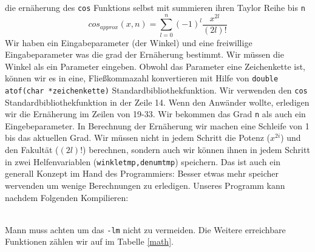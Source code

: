 die ernäherung des \texttt{cos} Funktions selbst mit summieren ihren Taylor Reihe
bis \texttt{n}
\begin{equation}
cos_{approx}\left(x,n\right)=\sum_{l=0}^{n} \left(-1\right)^{l} \dfrac{x^{2l}}{\left(2l\right)!}
\end{equation}
Wir haben ein Eingabeparameter (der Winkel) und eine freiwillige Eingabeparameter
was die grad der Ernäherung bestimmt. Wir müssen die Winkel als ein Parameter eingeben.
Obwohl das Parameter eine Zeichenkette ist, können wir es in eine, Fließkommazahl konvertieren
mit Hilfe von \texttt{double atof(char *zeichenkette)} Standardbibliothekfunktion. 
Wir verwenden den \texttt{cos} Standardbibliothekfunktion in der Zeile 14. Wenn
den Anwänder wollte, erledigen wir die Ernäherung im Zeilen von 19-33. Wir bekommen 
das Grad \texttt{n} als auch ein Eingebeparameter. In Berechnung der Ernäherung wir machen 
eine Schleife von 1 bis das aktuellen Grad. Wir müssen nicht in jedem Schritt die 
Potenz ($x^{2i}$) und den Fakultät ($(2l)!$) berechnen, sondern auch wir können 
ihnen in jedem Schritt in zwei Helfenvariablen (\texttt{winkletmp,denumtmp}) speichern.
Das ist auch ein generall Konzept im Hand des Programmiers: Besser etwas mehr speicher
wervenden um wenige Berechnungen zu erledigen. 
Unseres Programm kann nachdem Folgenden Kompilieren:\\
\\
Mann muss achten um das \texttt{-lm} nicht zu vermeiden.
Die Weitere erreichbare  Funktionen zählen wir auf im Tabelle \ref{math}. 
